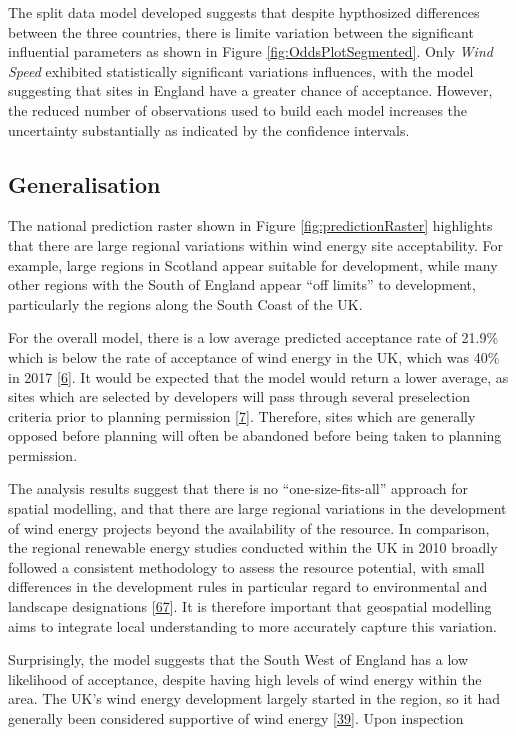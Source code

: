 \documentclass[a4paper,]{article}
\theoremstyle{definition}
\theoremstyle{definition}
\theoremstyle{definition}
\theoremstyle{remark}
\begin{document}
The split data model developed suggests that despite hypthosized
differences between the three countries, there is limite variation
between the significant influential parameters as shown in Figure
\ref{fig:OddsPlotSegmented}. Only \emph{Wind Speed} exhibited
statistically significant variations influences, with the model
suggesting that sites in England have a greater chance of acceptance.
However, the reduced number of observations used to build each model
increases the uncertainty substantially as indicated by the confidence
intervals.

\subsection{Generalisation}\label{generalisation-1}

The national prediction raster shown in Figure
\ref{fig:predictionRaster} highlights that there are large regional
variations within wind energy site acceptability. For example, large
regions in Scotland appear suitable for development, while many other
regions with the South of England appear ``off limits'' to development,
particularly the regions along the South Coast of the UK.

For the overall model, there is a low average predicted acceptance rate
of 21.9\% which is below the rate of acceptance of wind energy in the
UK, which was 40\% in 2017 {[}\protect\hyperlink{ref-DECC2016}{6}{]}. It
would be expected that the model would return a lower average, as sites
which are selected by developers will pass through several preselection
criteria prior to planning permission
{[}\protect\hyperlink{ref-Smith2016}{7}{]}. Therefore, sites which are
generally opposed before planning will often be abandoned before being
taken to planning permission.

The analysis results suggest that there is no ``one-size-fits-all''
approach for spatial modelling, and that there are large regional
variations in the development of wind energy projects beyond the
availability of the resource. In comparison, the regional renewable
energy studies conducted within the UK in 2010 broadly followed a
consistent methodology to assess the resource potential, with small
differences in the development rules in particular regard to
environmental and landscape designations
{[}\protect\hyperlink{ref-Stoddart2012}{67}{]}. It is therefore
important that geospatial modelling aims to integrate local
understanding to more accurately capture this variation.

Surprisingly, the model suggests that the South West of England has a
low likelihood of acceptance, despite having high levels of wind energy
within the area. The UK's wind energy development largely started in the
region, so it had generally been considered supportive of wind energy
{[}\protect\hyperlink{ref-Eltham2008}{39}{]}. Upon inspection
\end{document}
